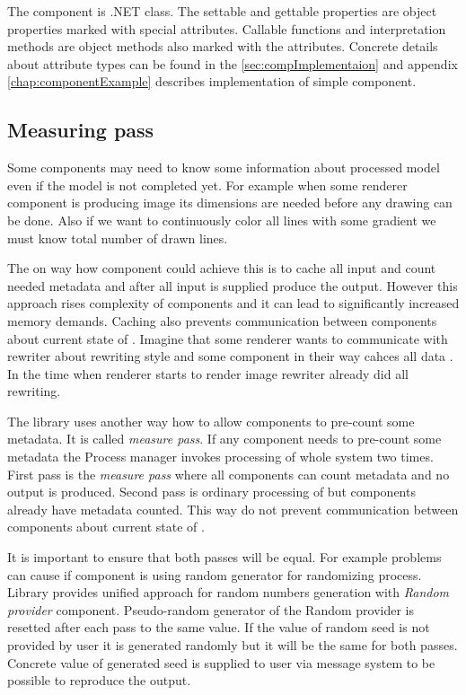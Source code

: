 The component is .NET class.
The settable and gettable properties are object properties marked with special attributes.
Callable functions and interpretation methods are object methods also marked with the attributes.
Concrete details about attribute types can be found in the \autoref{sec:compImplementaion} and appendix \ref{chap:componentExample} describes implementation of simple component.


\subsection{Measuring pass}
\label{sec:measuring}

Some components may need to know some information about processed model even if the model is not completed yet.
For example when some renderer component is producing image its dimensions are needed before any drawing can be done.
Also if we want to continuously color all lines with some gradient we must know total number of drawn lines.

The on way how component could achieve this is to cache all input and count needed metadata and after all input is supplied produce the output.
However this approach rises complexity of components and it can lead to significantly increased memory demands.
Caching also prevents communication between components about current state of \lsystem.
Imagine that some renderer wants to communicate with rewriter about rewriting style and some component in their way cahces all data .
In the time when renderer starts to render image rewriter already did all rewriting.

The library uses another way how to allow components to pre-count some metadata.
It is called \emph{measure pass}.
If any component needs to pre-count some metadata the Process manager invokes processing of whole system two times.
First pass is the \emph{measure pass} where all components can count metadata and no output is produced.
Second pass is ordinary processing of \lsystem but components already have metadata counted.
This way do not prevent communication between components about current state of \lsystem.

It is important to ensure that both passes will be equal.
For example problems can cause if component is using random generator for randomizing process.
Library provides unified approach for random numbers generation with \emph{Random provider} component.
Pseudo-random generator of the Random provider is resetted after each pass to the same value.
If the value of random seed is not provided by user it is generated randomly but it will be the same for both passes.
Concrete value of generated seed is supplied to user via message system to be possible to reproduce the output.

